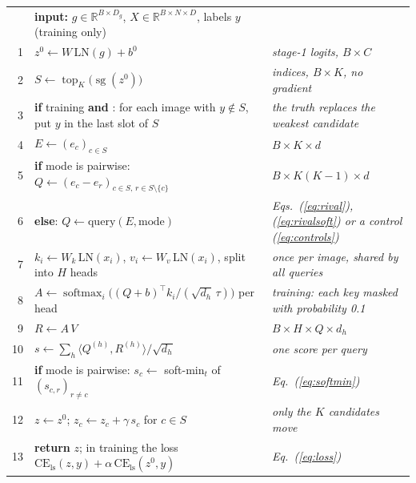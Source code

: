 \documentclass[11pt,a4paper]{article}
\theoremstyle{plain}
\newcommand{\fn}[1]{\texttt{\detokenize{#1}}}
\newcommand{\R}{\mathbb{R}}
\newcommand{\LN}{\mathrm{LN}}
\newcommand{\sg}{\operatorname{sg}}
\newcommand{\topk}{\operatorname{top}_K}
\newcommand{\CE}{\mathrm{CE}_{\mathrm{ls}}}
\begin{document}
\begin{pseudocode}[!htbp]
\caption{One forward pass of the re-ranking head on a batch (as implemented in \texttt{CandidateReRanker.forward}).}
\label{alg:rcea}
\small
\begin{tabular}{@{}r@{\hspace{0.7em}}p{9.8cm}@{\hspace{0.8em}}>{\raggedright\arraybackslash\itshape}p{4.4cm}@{}}
 & \textbf{input:} $g\in\R^{B\times D_g}$, $X\in\R^{B\times N\times D}$, labels $y$ (training only) & \\
1 & $z^0\leftarrow W\,\LN(g)+b^0$ & stage-1 logits, $B\times C$\\
2 & $S\leftarrow\topk\bigl(\sg(z^0)\bigr)$ & indices, $B\times K$, no gradient\\
3 & \textbf{if} training \textbf{and} \fn{gt_insert}: for each image with $y\notin S$, put $y$ in the last slot of $S$ & the truth replaces the weakest candidate\\
4 & $E\leftarrow(e_c)_{c\in S}$ & $B\times K\times d$\\
5 & \textbf{if} mode is pairwise: $Q\leftarrow(e_c-e_r)_{c\in S,\,r\in S\setminus\{c\}}$ & $B\times K(K-1)\times d$\\
6 & \textbf{else}: $Q\leftarrow\mathrm{query}(E,\text{mode})$ & Eqs.~(\ref{eq:rival}), (\ref{eq:rivalsoft}) or a control (\ref{eq:controls})\\
7 & $k_i\leftarrow W_k\,\LN(x_i)$, $v_i\leftarrow W_v\,\LN(x_i)$, split into $H$ heads & once per image, shared by all queries\\
8 & $A\leftarrow\operatorname{softmax}_i\bigl((Q+b)^{\top}k_i/(\sqrt{d_h}\,\tau)\bigr)$ per head & training: each key masked with probability 0.1\\
9 & $R\leftarrow A\,V$ & $B\times H\times Q\times d_h$\\
10 & $s\leftarrow\sum_h\langle Q^{(h)},R^{(h)}\rangle/\sqrt{d_h}$ & one score per query\\
11 & \textbf{if} mode is pairwise: $s_c\leftarrow$ soft-min$_t$ of $(s_{c,r})_{r\neq c}$ & Eq.~(\ref{eq:softmin})\\
12 & $z\leftarrow z^0$; $z_c\leftarrow z_c+\gamma\,s_c$ for $c\in S$ & only the $K$ candidates move\\
13 & \textbf{return} $z$; in training the loss $\CE(z,y)+\alpha\,\CE(z^0,y)$ & Eq.~(\ref{eq:loss})\\
\end{tabular}
\end{pseudocode}
\end{document}
